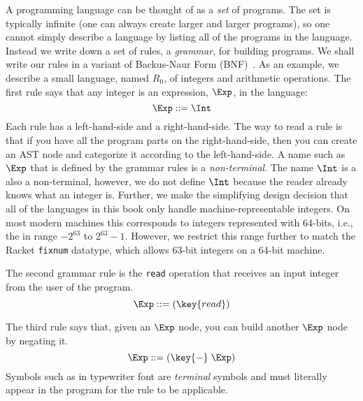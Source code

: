 \documentclass[11pt]{book}
\begin{document}
A programming language can be thought of as a \emph{set} of programs.
The set is typically infinite (one can always create larger and larger
programs), so one cannot simply describe a language by listing all of
the programs in the language. Instead we write down a set of rules, a
\emph{grammar}, for building programs. We shall write our rules in a
variant of Backus-Naur Form (BNF)~\citep{Backus:1960aa,Knuth:1964aa}.
As an example, we describe a small language, named $R_0$, of
integers and arithmetic operations. The first rule says that any
integer is an expression, $\Exp$, in the language:
\begin{equation}
\Exp ::= \Int  \label{eq:arith-int}
\end{equation}
%
Each rule has a left-hand-side and a right-hand-side. The way to read
a rule is that if you have all the program parts on the
right-hand-side, then you can create an AST node and categorize it
according to the left-hand-side.
%
A name such as $\Exp$ that is
defined by the grammar rules is a \emph{non-terminal}.
%
The name $\Int$ is a also a non-terminal, however,
we do not define $\Int$ because the
reader already knows what an integer is.
%
Further, we make the simplifying design decision that all of the languages in
this book only handle machine-representable integers.  On most modern machines
this corresponds to integers represented with 64-bits, i.e., the in range
$-2^{63}$ to $2^{63}-1$.
%
However, we restrict this range further to match the Racket \texttt{fixnum}
datatype, which allows 63-bit integers on a 64-bit machine.

The second grammar rule is the \texttt{read} operation that receives
an input integer from the user of the program.
\begin{equation}
  \Exp ::= (\key{read}) \label{eq:arith-read}
\end{equation}

The third rule says that, given an $\Exp$ node, you can build another
$\Exp$ node by negating it.
\begin{equation}
  \Exp ::= (\key{-} \; \Exp)  \label{eq:arith-neg}
\end{equation}
Symbols such as \key{-} in typewriter font are \emph{terminal} symbols
and must literally appear in the program for the rule to be
applicable.
\end{document}
